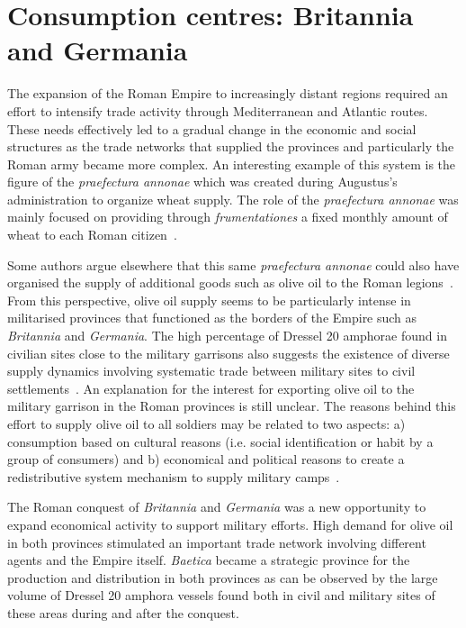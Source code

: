 \section{Consumption centres: Britannia and Germania}
\label{sec:3}

The expansion of the Roman Empire to increasingly distant regions required an effort to intensify trade activity through Mediterranean and Atlantic routes. These needs effectively led to a gradual change in the economic and social structures as the trade networks that supplied the provinces and particularly the Roman army became more complex. An interesting example of this system is the figure of the \textit{praefectura annonae} which was created during Augustus's administration to organize wheat supply. The role of the \textit{praefectura annonae} was mainly focused on providing through \textit{frumentationes} a fixed monthly amount of wheat to each Roman citizen~\citep{remesal_annona_1986,remesal_concierto}.

Some authors argue elsewhere that this same \textit{praefectura annonae} could also have organised the supply of additional goods such as olive oil to the Roman legions~\citep{remesal_annona_1986,remesal_annona_1990}. From this perspective, olive oil supply seems to be particularly intense in militarised provinces that functioned as the borders of the Empire such as \textit{Britannia} and \textit{Germania}. The high percentage of Dressel 20 amphorae found in civilian sites close to the military garrisons also suggests the existence of diverse supply dynamics involving systematic trade between military sites to civil settlements~\citep{remesal_annona_1986, carreras_britannia_1998}. An explanation for the interest for exporting olive oil to the military garrison in the Roman provinces is still unclear. The reasons behind this effort to supply olive oil to all soldiers may be related to two aspects: a) consumption based on cultural reasons (i.e. social identification or habit  by a group of consumers) and b) economical and political reasons to create a redistributive system mechanism to supply military camps~\citep[69-70]{carreras_britannia_1998}. 

The Roman conquest of \textit{Britannia} and \textit{Germania} was a new opportunity to expand economical activity to support military efforts. High demand for olive oil in both provinces stimulated an important trade network involving different agents and the Empire itself. \textit{Baetica} became a strategic province for the production and distribution in both provinces as can be observed by the large volume of Dressel 20 amphora vessels found both in civil and military sites of these areas during and after the conquest. 

